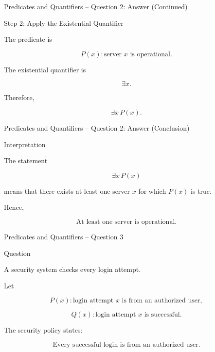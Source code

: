 
\begin{frame}{Predicates and Quantifiers -- Question 2: Answer (Continued)}

\begin{exampleblock}{Step 2: Apply the Existential Quantifier}

The predicate is

$$
P(x):\text{server $x$ is operational}.
$$

The existential quantifier is

$$
\exists x.
$$

Therefore,

$$
\boxed{\exists x\,P(x)}.
$$

\end{exampleblock}

\end{frame}


\begin{frame}{Predicates and Quantifiers -- Question 2: Answer (Conclusion)}

\begin{exampleblock}{Interpretation}

The statement

$$
\exists x\,P(x)
$$

means that there exists at least one server $x$ for which $P(x)$ is
true.

Hence,

$$
\boxed{\text{At least one server is operational.}}
$$

\end{exampleblock}

\end{frame}


\begin{frame}{Predicates and Quantifiers -- Question 3}

\begin{block}{Question}

A security system checks every login attempt.

Let

$$
P(x):\text{login attempt $x$ is from an authorized user},
$$

$$
Q(x):\text{login attempt $x$ is successful}.
$$

The security policy states:

$$
\text{Every successful login is from an authorized user.}
$$

\end{block}

\end{frame}

